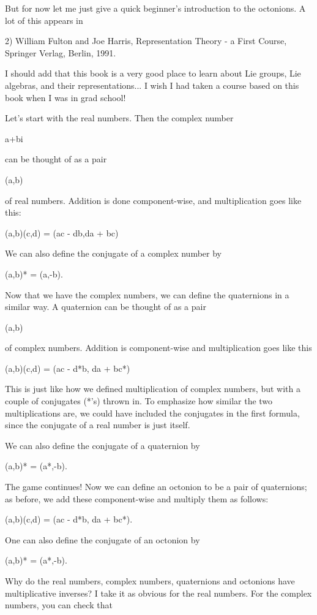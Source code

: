 But for now let me just give a quick beginner's introduction to the
octonions.  A lot of this appears in 

2) William Fulton and Joe Harris, Representation Theory - a First
Course, Springer Verlag, Berlin, 1991.

I should add that this book is a very good place to learn about
Lie groups, Lie algebras, and their representations... I wish I had
taken a course based on this book when I was in grad school!

Let's start with the real numbers.  Then the complex number

a+bi

can be thought of as a pair

(a,b)

of real numbers.  Addition is done component-wise, and 
multiplication goes like this:


(a,b)(c,d) = (ac - db,da + bc)

We can also define the conjugate of a complex number by

(a,b)* = (a,-b).

Now that we have the complex numbers, we can define the
quaternions in a similar way.  A quaternion can be thought of 
as a pair

(a,b)

of complex numbers.  Addition is component-wise and 
multiplication goes like this

(a,b)(c,d) = (ac - d*b, da + bc*)

This is just like how we defined multiplication of
complex numbers, but with a couple of conjugates (*'s)
thrown in.  To emphasize how similar the two multiplications
are, we could have included the conjugates in the first 
formula, since the conjugate of a real number is just itself. 

We can also define the conjugate of a quaternion by

(a,b)* = (a*,-b).

The game continues!  Now we can define an octonion to be a pair 
of quaternions; as before, we add these component-wise and
multiply them as follows:

(a,b)(c,d) = (ac - d*b, da + bc*).

One can also define the conjugate of an octonion by

(a,b)* = (a*,-b).

Why do the real numbers, complex numbers, quaternions
and octonions have multiplicative inverses?  I take it as
obvious for the real numbers.  For the complex numbers, 
you can check that

